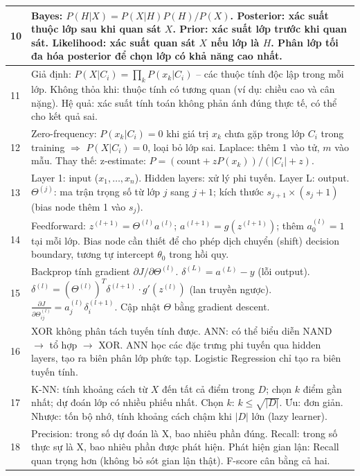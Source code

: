 \documentclass[10pt]{article}
\begin{document}
\begin{singlespace}
\begin{longtable}{|p{}|p{}|}
\hline
10 & Bayes: $P(H|X) = P(X|H)P(H)/P(X)$. Posterior: xác suất thuộc lớp sau khi quan sát $X$. Prior: xác suất lớp trước khi quan sát. Likelihood: xác suất quan sát $X$ nếu lớp là $H$. Phân lớp tối đa hóa posterior để chọn lớp có khả năng cao nhất. \\
\hline
11 & Giả định: $P(X|C_i) = \prod_k P(x_k|C_i)$ -- các thuộc tính độc lập trong mỗi lớp. Không thỏa khi: thuộc tính có tương quan (ví dụ: chiều cao và cân nặng). Hệ quả: xác suất tính toán không phản ánh đúng thực tế, có thể cho kết quả sai. \\
\hline
12 & Zero-frequency: $P(x_k|C_i) = 0$ khi giá trị $x_k$ chưa gặp trong lớp $C_i$ trong training $\Rightarrow$ $P(X|C_i) = 0$, loại bỏ lớp sai. Laplace: thêm 1 vào tử, $m$ vào mẫu. Thay thế: z-estimate: $P = (\text{count} + zP(x_k))/(|C_i| + z)$. \\
\hline
13 & Layer 1: input ($x_1, \ldots, x_n$). Hidden layers: xử lý phi tuyến. Layer L: output. $\Theta^{(j)}$: ma trận trọng số từ lớp $j$ sang $j+1$; kích thước $s_{j+1} \times (s_j + 1)$ (bias node thêm 1 vào $s_j$). \\
\hline
14 & Feedforward: $z^{(l+1)} = \Theta^{(l)} a^{(l)}$; $a^{(l+1)} = g(z^{(l+1)})$; thêm $a_0^{(l)}=1$ tại mỗi lớp. Bias node cần thiết để cho phép dịch chuyển (shift) decision boundary, tương tự intercept $\theta_0$ trong hồi quy. \\
\hline
15 & Backprop tính gradient $\partial J/\partial \Theta^{(l)}$. $\delta^{(L)} = a^{(L)} - y$ (lỗi output). $\delta^{(l)} = (\Theta^{(l)})^T\delta^{(l+1)} \cdot g'(z^{(l)})$ (lan truyền ngược). $\frac{\partial J}{\partial \Theta^{(l)}_{ij}} = a_j^{(l)}\delta_i^{(l+1)}$. Cập nhật $\Theta$ bằng gradient descent. \\
\hline
16 & XOR không phân tách tuyến tính được. ANN: có thể biểu diễn NAND $\to$ tổ hợp $\to$ XOR. ANN học các đặc trưng phi tuyến qua hidden layers, tạo ra biên phân lớp phức tạp. Logistic Regression chỉ tạo ra biên tuyến tính. \\
\hline
17 & K-NN: tính khoảng cách từ $X$ đến tất cả điểm trong $D$; chọn $k$ điểm gần nhất; dự đoán lớp có nhiều phiếu nhất. Chọn $k$: $k \leq \sqrt{|D|}$. Ưu: đơn giản. Nhược: tốn bộ nhớ, tính khoảng cách chậm khi $|D|$ lớn (lazy learner). \\
\hline
18 & Precision: trong số dự đoán là X, bao nhiêu phần đúng. Recall: trong số thực sự là X, bao nhiêu phần được phát hiện. Phát hiện gian lận: Recall quan trọng hơn (không bỏ sót gian lận thật). F-score cân bằng cả hai. \\

\end{longtable}
\end{singlespace}
\end{document}
